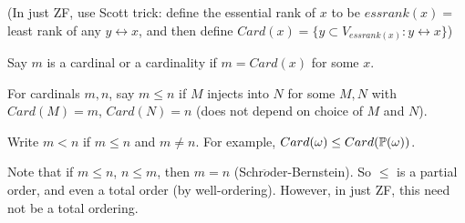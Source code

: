 \documentclass[a4paper]{article}
\begin{document}
(In just ZF, use Scott trick: define the essential rank of $x$ to be $essrank(x)=$least rank of any $y \leftrightarrow x$, and then define $Card(x) = \{y \subset V_{essrank(x)}:y \leftrightarrow x\}$)

Say $m$ is a cardinal or a cardinality if $m=Card(x)$ for some $x$.

For cardinals $m,n$, say $m \leq n$ if $M$ injects into $N$ for some $M,N$ with $Card(M) = m$, $Card(N) = n$ (does not depend on choice of $M$ and $N$).

Write $m<n$ if $m \leq n$ and $m \neq n$. For example, $Card(\omega) \leq Card(\P(\omega))$.

Note that if $m \leq n$, $n \leq m$, then $m=n$ (Schr$\ddot{o}$der-Bernstein). So $\leq$ is a partial order, and even a total order (by well-ordering). However, in just ZF, this need not be a total ordering.

\iffalse
\begin{equation*}
\begin{aligned}

\end{aligned}
\end{equation*}
\fi
\end{document}
